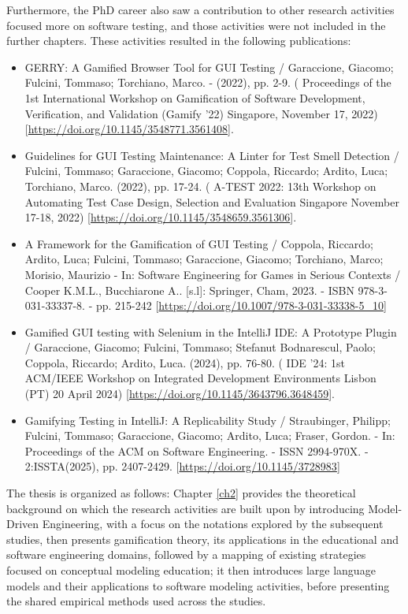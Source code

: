 Furthermore, the PhD career also saw a contribution to other research activities focused more on software testing, and those activities were not included in the further chapters. These activities resulted in the following publications:
\begin{itemize}
    \item GERRY: A Gamified Browser Tool for GUI Testing / Garaccione, Giacomo; Fulcini, Tommaso; Torchiano, Marco. - (2022), pp. 2-9. ( Proceedings of the 1st International Workshop on Gamification of Software Development, Verification, and Validation (Gamify '22) Singapore, November 17, 2022) [\url{https://doi.org/10.1145/3548771.3561408}].
    \item Guidelines for GUI Testing Maintenance: A Linter for Test Smell Detection / Fulcini, Tommaso; Garaccione, Giacomo; Coppola, Riccardo; Ardito, Luca; Torchiano, Marco. (2022), pp. 17-24. ( A-TEST 2022: 13th Workshop on Automating Test Case Design, Selection and Evaluation Singapore November 17-18, 2022) [\url{https://doi.org/10.1145/3548659.3561306}].
    \item A Framework for the Gamification of GUI Testing / Coppola, Riccardo; Ardito, Luca; Fulcini, Tommaso; Garaccione, Giacomo; Torchiano, Marco; Morisio, Maurizio - In: Software Engineering for Games in Serious Contexts / Cooper K.M.L., Bucchiarone A.. [s.l]: Springer, Cham, 2023. - ISBN 978-3-031-33337-8. - pp. 215-242 [\url{https://doi.org/10.1007/978-3-031-33338-5\_10}]
    \item Gamified GUI testing with Selenium in the IntelliJ IDE: A Prototype Plugin / Garaccione, Giacomo; Fulcini, Tommaso; Stefanut Bodnarescul, Paolo; Coppola, Riccardo; Ardito, Luca. (2024), pp. 76-80. ( IDE '24: 1st ACM/IEEE Workshop on Integrated Development Environments Lisbon (PT) 20 April 2024) [\url{https://doi.org/10.1145/3643796.3648459}].
    \item Gamifying Testing in IntelliJ: A Replicability Study / Straubinger, Philipp; Fulcini, Tommaso; Garaccione, Giacomo; Ardito, Luca; Fraser, Gordon. - In: Proceedings of the ACM on Software Engineering. - ISSN 2994-970X. - 2:ISSTA(2025), pp. 2407-2429. [\url{https://doi.org/10.1145/3728983}]
\end{itemize}

The thesis is organized as follows: Chapter \ref{ch2} provides the theoretical background on which the research activities are built upon by introducing Model-Driven Engineering, with a focus on the notations explored by the subsequent studies, then presents gamification theory, its applications in the educational and software engineering domains, followed by a mapping of existing strategies focused on conceptual modeling education; it then introduces large language models and their applications to software modeling activities, before presenting the shared empirical methods used across the studies.

